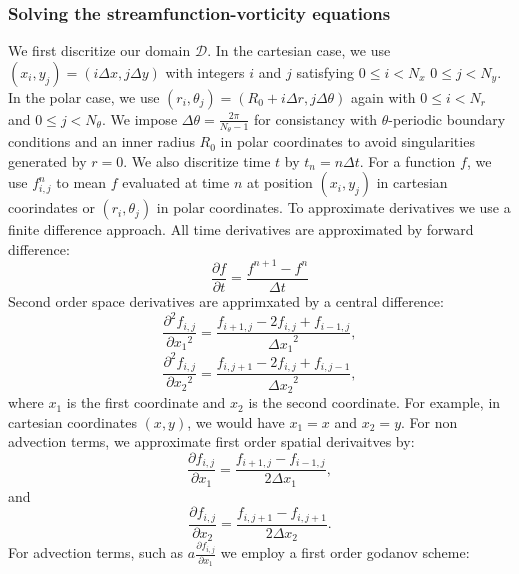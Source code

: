 \documentclass{article}
\begin{document}
\subsubsection*{Solving the streamfunction-vorticity equations}
We first discritize our domain $\mathcal{D}$. In the cartesian case, we use $(x_i,y_j)=(i \Delta x, j \Delta y)$ with integers $i$ and $j$ satisfying $0\leq i < N_x$ $0 \leq j < N_y$. In the polar case, we use $(r_i, \theta_j)= (R_0 + i \Delta r, j 
\Delta \theta)$ again with  $0 \leq i < N_r$ and $0 \leq j < N_{\theta}$. We impose $\Delta \theta = \frac{2 \pi}{N_{\theta} - 1}$ for consistancy with $\theta$-periodic boundary conditions and an inner radius $R_0$ in polar coordinates to avoid 
singularities generated by $r=0$. We also discritize time $t$ by $t_n = n \Delta t$. For a function $f$, we use $f^n_{i,j}$ to mean $f$ evaluated at time $n$ at position $(x_i,y_j)$ in cartesian coorindates or $(r_i, \theta_j)$ in polar 
coordinates. 
\newline
To approximate derivatives we use a finite difference approach. All time derivatives are approximated by forward difference:
\begin{equation}
	\frac{\partial f}{\partial t} = \frac{f^{n+1} - f^{n}}{\Delta t}
	\label{forward time difference}
\end{equation}
Second order space derivatives are apprimxated by a central difference:
\begin{equation}
	\frac{\partial^2 f_{i,j}}{\partial {x_1}^2} = \frac{f_{i+1,j} - 2 f_{i,j} + f_{i-1,j}}{{\Delta x_1}^2},
\end{equation}
\begin{equation}
	\frac{\partial^2 f_{i,j}}{\partial {x_2}^2} = \frac{f_{i,j+1} - 2 f_{i,j} + f_{i,j-1}}{{\Delta x_2}^2},
\end{equation}
where $x_1$ is the first coordinate and $x_2$ is the second coordinate. For example, in cartesian coordinates $(x,y)$, we would have $x_1=x$ and $x_2=y$. 
For non advection terms, we approximate first order spatial derivaitves by:
\begin{equation}
	\frac{\partial f_{i,j}}{\partial x_1} = \frac{f_{i+1,j} - f_{i-1,j}}{2{\Delta x_1}},
\end{equation}
and
\begin{equation}
	\frac{\partial f_{i,j}}{\partial x_2} = \frac{f_{i,j+1} - f_{i,j+1}}{2{\Delta x_2}}.
\end{equation}
For advection terms, such as $a \frac{\partial f_{i,j}}{\partial x_1}$ we employ a first order godanov scheme:
\end{document}

